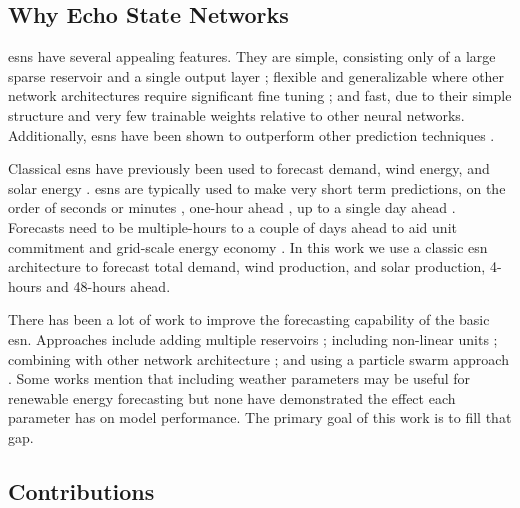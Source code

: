 \subsection{Why Echo State Networks}
\glspl{esn} have several appealing features. They are simple, consisting only
of a large sparse reservoir and a single output layer
\cite{lukosevicius_practical_2012}; flexible and generalizable
where other network architectures require significant fine tuning
\cite{noauthor_deterministic_2019}; and fast, due to their simple structure and
very few trainable weights relative to other neural networks. Additionally,
\glspl{esn} have been shown to outperform other prediction techniques
\cite{jayawardene_comparison_2014,jayawardene_comparison_2015,shi_energy_2016,chitsazan_wind_2019, hu_forecasting_2020}.

Classical \glspl{esn} have previously been used to forecast demand, wind energy, and solar energy \cite{deihimi_application_2012,jayawardene_comparison_2015,hu_forecasting_2020}.
\glspl{esn} are typically used to make very short term predictions, on the
order of seconds or minutes
\cite{chen_novel_2019,wang_echo_2019,chitsazan_wind_2019}, one-hour ahead
\cite{shi_energy_2016}, up to a single day ahead
\cite{deihimi_application_2012}. Forecasts need to be multiple-hours to a
couple of days ahead to aid unit commitment and grid-scale energy economy
\cite{wang_quantifying_2016,mc_garrigle_quantifying_2015,brancucci_martinez-anido_value_2016}. In this work we use a classic \gls{esn} architecture to
forecast total demand, wind production, and solar production, 4-hours and 48-hours ahead.

There has been a lot of work to improve the forecasting capability of
the basic \gls{esn}. Approaches include adding multiple reservoirs
\cite{hu_forecasting_2020,gallicchio_deep_2019,yao_novel_2019,li_multi-reservoir_2020}; including non-linear units \cite{holzmann_echo_2008, chitsazan_wind_2019}; combining with other network architecture
\cite{chen_novel_2019, lopez_wind_2018}; and using a particle swarm approach \cite{chouikhi_pso-based_2017,wang_echo_2019}. Some works mention that
including weather parameters may be useful for renewable energy forecasting
\cite{li_echo_2019,chitsazan_wind_2019} but none have demonstrated the effect
each parameter has on model performance. The primary goal of this work
is to fill that gap.


\subsection{Contributions}
